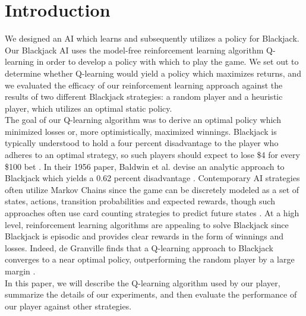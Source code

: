 
\section{Introduction}
\label{sec:intro}
We designed an AI which learns and subsequently utilizes a policy for Blackjack. Our Blackjack AI uses the model-free reinforcement learning algorithm Q-learning in order to develop a policy with which to play the game. We set out to determine whether Q-learning would yield a policy which maximizes returns, and we evaluated the efficacy of our reinforcement learning approach against the results of two different Blackjack strategies: a random player and a heuristic player, which utilizes an optimal static policy. \\

\noindent The goal of our Q-learning algorithm was to derive an optimal policy which minimized losses or, more optimistically, maximized winnings. Blackjack is typically understood to hold a four percent disadvantage to the player who adheres to an optimal strategy, so such players should expect to lose \$4 for every \$100 bet \cite{b}. In their 1956 paper, Baldwin et al. devise an analytic approach to  Blackjack which yields a 0.62 percent disadvantage \cite{c}. Contemporary AI strategies often utilize Markov Chains since the game can be discretely modeled as a set of states, actions, transition probabilities and expected rewards, though such approaches often use card counting strategies to predict future states \cite{m}. At a high level, reinforcement learning algorithms are appealing to solve Blackjack since Blackjack is episodic and provides clear rewards in the form of winnings and losses. Indeed, de Granville finds that a Q-learning approach to Blackjack converges to a near optimal policy, outperforming the random player by a large margin \cite{q}. \\

\noindent In this paper, we will describe the Q-learning algorithm used by our player, summarize the details of our experiments, and then evaluate the performance of our player against other strategies. 



